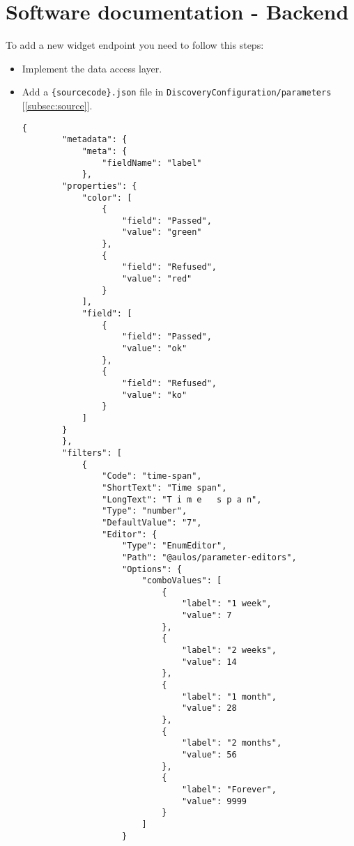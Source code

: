\section{Software documentation - Backend}
To add a new widget endpoint you need to follow this steps:
\begin{itemize}
    \item Implement the data access layer.
    \item Add a \verb|{sourcecode}.json| file in \verb|DiscoveryConfiguration/parameters| [\ref{subsec:source}].
    \begin{lstlisting}[caption={{sourcecode}.json example}, style=javaScriptCode]
    {
        "metadata": {
            "meta": {
                "fieldName": "label"
            },
        "properties": {
            "color": [
                {
                    "field": "Passed",
                    "value": "green"
                },
                {
                    "field": "Refused",
                    "value": "red"
                }
            ],
            "field": [
                {
                    "field": "Passed",
                    "value": "ok"
                },
                {
                    "field": "Refused",
                    "value": "ko"
                }
            ]
        }
        },
        "filters": [
            {
                "Code": "time-span",
                "ShortText": "Time span",
                "LongText": "T i m e   s p a n",
                "Type": "number",
                "DefaultValue": "7",
                "Editor": {
                    "Type": "EnumEditor",
                    "Path": "@aulos/parameter-editors",
                    "Options": {
                        "comboValues": [
                            {
                                "label": "1 week",
                                "value": 7
                            },
                            {
                                "label": "2 weeks",
                                "value": 14
                            },
                            {
                                "label": "1 month",
                                "value": 28
                            },
                            {
                                "label": "2 months",
                                "value": 56
                            },
                            {
                                "label": "Forever",
                                "value": 9999
                            }
                        ]
                    }

\end{lstlisting}
\end{itemize}
